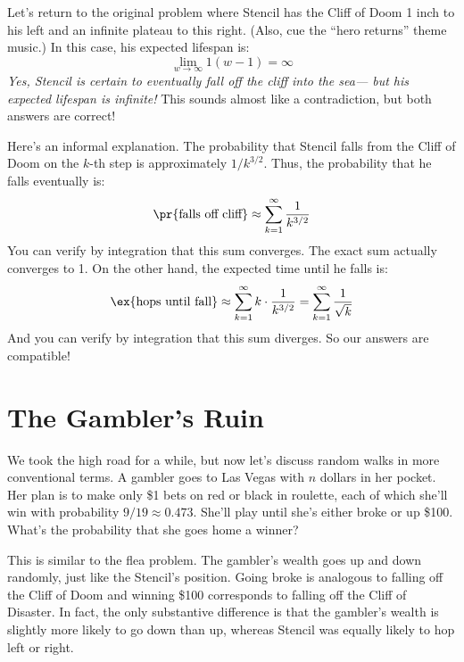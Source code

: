 Let's return to the original problem where Stencil has the Cliff of
Doom 1 inch to his left and an infinite plateau to this right.  (Also,
cue the ``hero returns'' theme music.)  In this case, his expected
lifespan is:
%
\[
\lim_{w \to \infty} 1 (w - 1) = \infty
\]
%
\textit{Yes, Stencil is certain to eventually fall off the cliff into
the sea--- but his expected lifespan is infinite!}  This sounds almost
like a contradiction, but both answers are correct!

Here's an informal explanation.  The probability that Stencil falls
from the Cliff of Doom on the $k$-th step is approximately $1 /
k^{3/2}$.  Thus, the probability that he falls eventually is:
%
\[
\pr{\text{falls off cliff}} \approx \sum_{k=1}^{\infty} \frac{1}{k^{3/2}}
\]
%
You can verify by integration that this sum converges.  The exact sum
actually converges to 1.  On the other hand, the expected time until
he falls is:
%
\[
\ex{\text{hops until fall}} \approx \sum_{k=1}^{\infty} k \cdot \frac{1}{k^{3/2}} = \sum_{k=1}^{\infty} \frac{1}{\sqrt{k}}
\]
%
And you can verify by integration that this sum diverges.  So our
answers are compatible!


\section{The Gambler's Ruin}

We took the high road for a while, but now let's discuss random walks
in more conventional terms.  A gambler goes to Las Vegas with $n$
dollars in her pocket.  Her plan is to make only \$1 bets on red or
black in roulette, each of which she'll win with probability $9/19
\approx 0.473$.  She'll play until she's either broke or up \$100.
What's the probability that she goes home a winner?

This is similar to the flea problem.  The gambler's wealth goes up and
down randomly, just like the Stencil's position.  Going broke is
analogous to falling off the Cliff of Doom and winning \$100
corresponds to falling off the Cliff of Disaster.  In fact, the only
substantive difference is that the gambler's wealth is slightly more
likely to go down than up, whereas Stencil was equally likely to hop
left or right.

